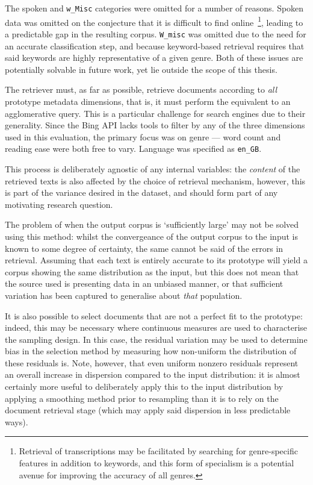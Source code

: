 The spoken and \texttt{w\_Misc} categories were omitted for a number of reasons.  Spoken data was omitted on the conjecture that it is difficult to find online~\footnote{Retrieval of transcriptions may be facilitated by searching for genre-specific features in addition to keywords, and this form of specialism is a potential avenue for improving the accuracy of all genres.}, leading to a predictable gap in the resulting corpus.  \texttt{W\_misc} was omitted due to the need for an accurate classification step, and because keyword-based retrieval requires that said keywords are highly representative of a given genre.  Both of these issues are potentially solvable in future work, yet lie outside the scope of this thesis.


The retriever must, as far as possible, retrieve documents according to \textsl{all} prototype metadata dimensions, that is, it must perform the equivalent to an agglomerative query.  This is a particular challenge for search engines due to their generality.  Since the Bing API lacks tools to filter by any of the three dimensions used in this evaluation, the primary focus was on genre --- word count and reading ease were both free to vary.  Language was specified as \texttt{en\_GB}.









This process is deliberately agnostic of any internal variables: the \textsl{content} of the retrieved texts is also affected by the choice of retrieval mechanism, however, this is part of the variance desired in the dataset, and should form part of any motivating research question.

The problem of when the output corpus is `sufficiently large' may not be solved using this method: whilst the convergeance of the output corpus to the input is known to some degree of certainty, the same cannot be said of the errors in retrieval.  Assuming that each text is entirely accurate to its prototype will yield a corpus showing the same distribution as the input, but this does not mean that the source used is presenting data in an unbiased manner, or that sufficient variation has been captured to generalise about \textsl{that} population.

It is also possible to select documents that are not a perfect fit to the prototype: indeed, this may be necessary where continuous measures are used to characterise the sampling design.  In this case, the residual variation may be used to determine bias in the selection method by measuring how non-uniform the distribution of these residuals is.  Note, however, that even uniform nonzero residuals represent an overall increase in dispersion compared to the input distribution: it is almost certainly more useful to deliberately apply this to the input distribution by applying a smoothing method prior to resampling than it is to rely on the document retrieval stage (which may apply said dispersion in less predictable ways).

